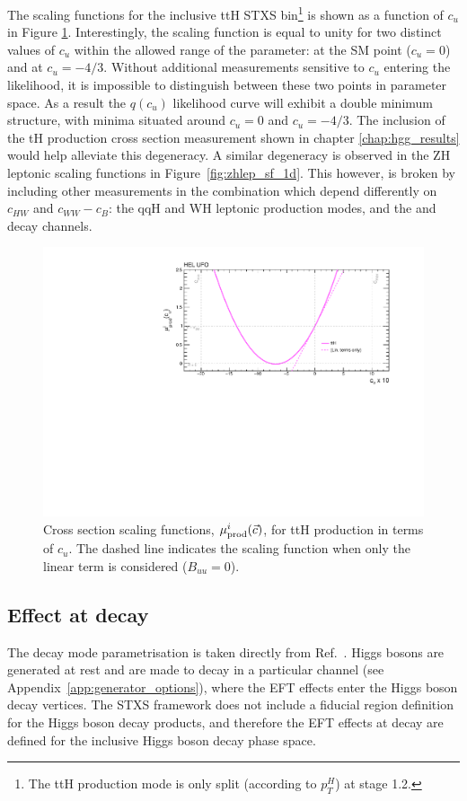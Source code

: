 The scaling functions for the inclusive ttH STXS bin\footnote{The ttH production mode is only split (according to $p_T^H$) at stage 1.2.} is shown as a function of $c_u$ in Figure \ref{fig:tth_sf_1d}. Interestingly, the scaling function is equal to unity for two distinct values of $c_u$ within the allowed range of the parameter: at the SM point ($c_u=0$) and at $c_u=-4/3$. Without additional measurements sensitive to $c_u$ entering the likelihood, it is impossible to distinguish between these two points in parameter space. As a result the $q(c_u)$ likelihood curve will exhibit a double minimum structure, with minima situated around $c_u=0$ and $c_u=-4/3$. The inclusion of the tH production cross section measurement shown in chapter \ref{chap:hgg_results} would help alleviate this degeneracy. A similar degeneracy is observed in the ZH leptonic scaling functions in Figure~\ref{fig:zhlep_sf_1d}. This however, is broken by including other measurements in the combination which depend differently on $c_{HW}$ and $c_{WW}-c_B$: the qqH and WH leptonic production modes, and the \HZZ and \HWW decay channels.

\begin{figure}[htb!]
  \centering
  \includegraphics[width=.7\textwidth]{Figures/eft/scaling_functions/ttH_vs_cu.pdf}
  \caption[HEL cross section scaling function for ttH STXS bin]
  {
    Cross section scaling functions, $\mu_{\rm{prod}}^i(\vec{c})$, for ttH production in terms of $c_{u}$. The dashed line indicates the scaling function when only the linear term is considered ($B_{uu}=0$).
  }
  \label{fig:tth_sf_1d}
\end{figure}


\subsection{Effect at decay}
The decay mode parametrisation is taken directly from Ref.~\cite{Hays:2673969}. Higgs bosons are generated at rest and are made to decay in a particular channel (see Appendix~\ref{app:generator_options}), where the EFT effects enter the Higgs boson decay vertices. The STXS framework does not include a fiducial region definition for the Higgs boson decay products, and therefore the EFT effects at decay are defined for the inclusive Higgs boson decay phase space. 

